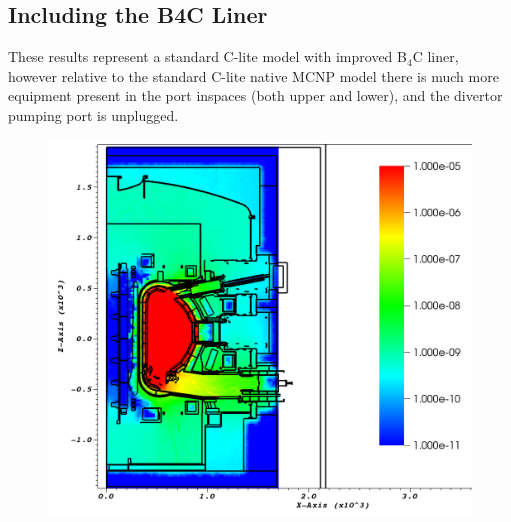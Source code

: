 \documentclass[12pt]{article}
\begin{document}
\subsection{Including the B4C Liner}
These results represent a standard C-lite model with improved B$_4$C liner, however relative to the standard C-lite native MCNP model there is much more equipment present in the port inspaces (both upper and lower), and the divertor pumping port is unplugged. 
\begin{figure}[ht!]
  \centering
  \includegraphics[scale=0.35]{../plots/neutron/b4c/flux_y0.png}     

\end{figure}
\end{document}
